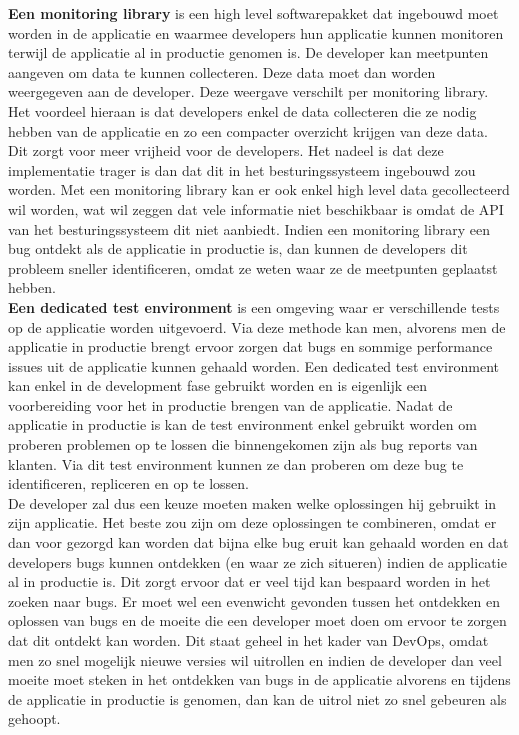 \textbf{Een monitoring library} is een high level softwarepakket dat ingebouwd moet worden in de applicatie en waarmee developers hun applicatie kunnen monitoren terwijl de applicatie al in productie genomen is. De developer kan meetpunten aangeven om data te kunnen collecteren. Deze data moet dan worden weergegeven aan de developer. Deze weergave verschilt per monitoring library. Het voordeel hieraan is dat developers enkel de data collecteren die ze nodig hebben van de applicatie en zo een compacter overzicht krijgen van deze data. Dit zorgt voor meer vrijheid voor de developers. Het nadeel is dat deze implementatie trager is dan dat dit in het besturingssysteem ingebouwd zou worden. Met een monitoring library kan er ook enkel high level data gecollecteerd wil worden, wat wil zeggen dat vele informatie niet beschikbaar is omdat de API van het besturingssysteem dit niet aanbiedt. Indien een monitoring library een bug ontdekt als de applicatie in productie is, dan kunnen de developers dit probleem sneller identificeren, omdat ze weten waar ze de meetpunten geplaatst hebben. \\

\textbf{Een dedicated test environment} is een omgeving waar er verschillende tests op de applicatie worden uitgevoerd. Via deze methode kan men, alvorens men de applicatie in productie brengt ervoor zorgen dat bugs en sommige performance issues uit de applicatie kunnen gehaald worden. Een dedicated test environment kan enkel in de development fase gebruikt worden en is eigenlijk een voorbereiding voor het in productie brengen van de applicatie. Nadat de applicatie in productie is kan de test environment enkel gebruikt worden om proberen problemen op te lossen die binnengekomen zijn als bug reports van klanten. Via dit test environment kunnen ze dan proberen om deze bug te identificeren, repliceren en op te lossen. \\

De developer zal dus een keuze moeten maken welke oplossingen hij gebruikt in zijn applicatie. Het beste zou zijn om deze oplossingen te combineren, omdat er dan voor gezorgd kan worden dat bijna elke bug eruit kan gehaald worden en dat developers bugs kunnen ontdekken (en waar ze zich situeren) indien de applicatie al in productie is. Dit zorgt ervoor dat er veel tijd kan bespaard worden in het zoeken naar bugs. Er moet wel een evenwicht gevonden tussen het ontdekken en oplossen van bugs en de moeite die een developer moet doen om ervoor te zorgen dat dit ontdekt kan worden. Dit staat geheel in het kader van DevOps, omdat men zo snel mogelijk nieuwe versies wil uitrollen en indien de developer dan veel moeite moet steken in het ontdekken van bugs in de applicatie alvorens en tijdens de applicatie in productie is genomen, dan kan de uitrol niet zo snel gebeuren als gehoopt.\\



